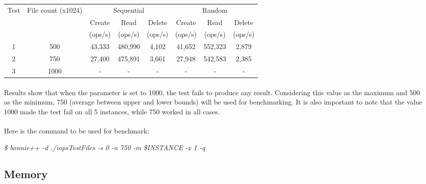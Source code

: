 \documentclass[11pt]{article}
\begin{document}
		\begin{minipage}{\linewidth}
		\begin{center}
			 \label{tab:iops_regression_analysis}
			\begin{tabular}{|*{8}{c|}}
				\hline
				\multirow{3}{*}{Test} & \multirow{3}{1.75cm}{File count (x1024)} & \multicolumn{3}{c}{Sequential}\vline & \multicolumn{3}{c}{Random}\vline \\\cline{3-8}
				&  & Create & Read & Delete & Create & Read & Delete \\
				&  & (ops/s) & (ops/s) & (ops/s) & (ops/s) & (ops/s) & (ops/s) \\
				\hline
				1 & 500 & 43,333 & 480,990 & 4,102 & 41,652 & 552,323 & 2,879 \\
				2 & 750 & 27,400 & 475,891 & 3,661 & 27,948 & 542,583 & 2,385 \\
				3 & 1000 & - & - & - & - & - & -\\
				\hline
			\end{tabular}
		\end{center}
		\end{minipage}

		\paragraph{} Results show that when the parameter is set to 1000, the
		test fails to produce any result. Considering this value as the maximum
		and 500 as the minimum, 750 (average between upper and lower bounds) 
		will be used for benchmarking. It is also
		important to note that the value 1000 made the test fail on all 5
		instances, while 750 worked in all cases.

		\paragraph{} Here is the command to be used for benchmark: \bigskip

		\indent \textit{\$ bonnie++ -d ./iopsTestFiles -s 0 -n 750 -m \$INSTANCE -x 1 -q}

	\subsection{Memory}
\end{document}
